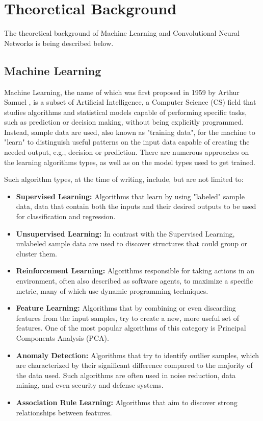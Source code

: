 \chapter{Theoretical Background}

\label{Chapter-Theoretical-Background}

The theoretical background of Machine Learning and Convolutional Neural Networks is being described below.

\section{Machine Learning}
Machine Learning, the name of which was first proposed in 1959 by Arthur Samuel \cite{Some-Studies-in-Machine-Learning-Using-the-Game-of-Checkers}, is a subset of Artificial Intelligence, a Computer Science (CS) field that studies algorithms and statistical models capable of performing specific tasks, such as prediction or decision making, without being explicitly programmed. Instead, sample data are used, also known as "training data", for the machine to "learn" to distinguish useful patterns on the input data capable of creating the needed output, e.g., decision or prediction. There are numerous approaches \cite{Machine-learning-Wikipedia} on the learning algorithms types, as well as on the model types used to get trained.

Such algorithm types, at the time of writing, include, but are not limited to:
\begin{itemize}
	\item \textbf{Supervised Learning:} Algorithms that learn by using "labeled" sample data, data that contain both the inputs and their desired outputs to be used for classification and regression.
	\item \textbf{Unsupervised Learning:} In contrast with the Supervised Learning, unlabeled sample data are used to discover structures that could group or cluster them.
	\item \textbf{Reinforcement Learning:} Algorithms responsible for taking actions in an environment, often also described as software agents, to maximize a specific metric, many of which use dynamic programming techniques.
	\item \textbf{Feature Learning:} Algorithms that by combining or even discarding features from the input samples, try to create a new, more useful set of features. One of the most popular algorithms of this category is Principal Components Analysis (PCA).
	\item \textbf{Anomaly Detection:} Algorithms that try to identify outlier samples, which are characterized by their significant difference compared to the majority of the data used. Such algorithms are often used in noise reduction, data mining, and even security and defense systems.
	\item \textbf{Association Rule Learning:} Algorithms that aim to discover strong relationships between features.
\end{itemize}

